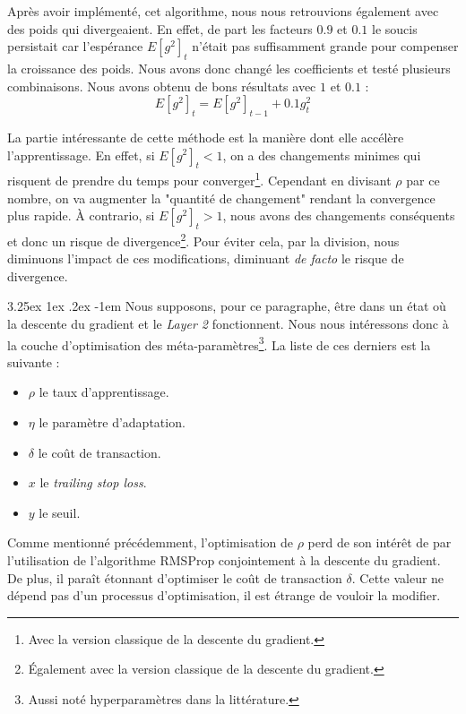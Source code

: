 \documentclass[a4paper, 11pt]{article}
\makeatletter
\renewcommand\paragraph{\@startsection{paragraph}{5}{\z@}%
  {3.25ex \@plus1ex \@minus.2ex}%
  {-1em}%
  {\normalfont\normalsize\bfseries}}
\makeatother
\begin{document}
  Après avoir implémenté, cet algorithme, nous nous retrouvions également avec des poids qui divergeaient. En effet, de part les facteurs $0.9$ et $0.1$ 
  le soucis persistait car l'espérance $E[g^2]_t$ n'était pas suffisamment grande pour compenser la croissance des poids. Nous avons donc changé les 
  coefficients et testé plusieurs combinaisons. Nous avons obtenu de bons résultats avec $1$ et $0.1$ :
  $$E[g^2]_t = E[g^2]_{t-1} + 0.1 g^2_t$$
  
  La partie intéressante de cette méthode est la manière dont elle accélère l'apprentissage. En effet, si $E[g^2]_t < 1$, on a des changements minimes 
  qui risquent de prendre du temps pour converger\footnote{Avec la version classique de la descente du gradient.}. Cependant en divisant $\rho$ par ce
  nombre, on va augmenter la "quantité de changement" rendant la convergence plus rapide. À contrario, si $E[g^2]_t > 1$, nous avons des changements 
  conséquents et donc un risque de divergence\footnote{Également avec la version classique de la descente du gradient.}. Pour éviter cela, par la division,
  nous diminuons l'impact de ces modifications, diminuant \textit{de facto} le risque de divergence.
  
  \paragraph{}
  Nous supposons, pour ce paragraphe, être dans un état où la descente du gradient et le \textit{Layer 2} fonctionnent. Nous nous intéressons donc à la couche 
  d'optimisation des méta-paramètres\footnote{Aussi noté hyperparamètres dans la littérature.}. La liste de ces derniers est la suivante :
  \begin{itemize}
   \item $\rho$ le taux d'apprentissage.
   \item $\eta$ le paramètre d'adaptation.
   \item $\delta$ le coût de transaction.
   \item $x$ le \textit{trailing stop loss}.
   \item $y$ le seuil.
  \end{itemize}

  Comme mentionné précédemment, l'optimisation de $\rho$ perd de son intérêt de par l'utilisation de l'algorithme RMSProp conjointement à la descente du
  gradient. De plus, il paraît étonnant d'optimiser le coût de transaction $\delta$. Cette valeur ne dépend pas d'un processus d'optimisation, il est
  étrange de vouloir la modifier.
  
\end{document}
